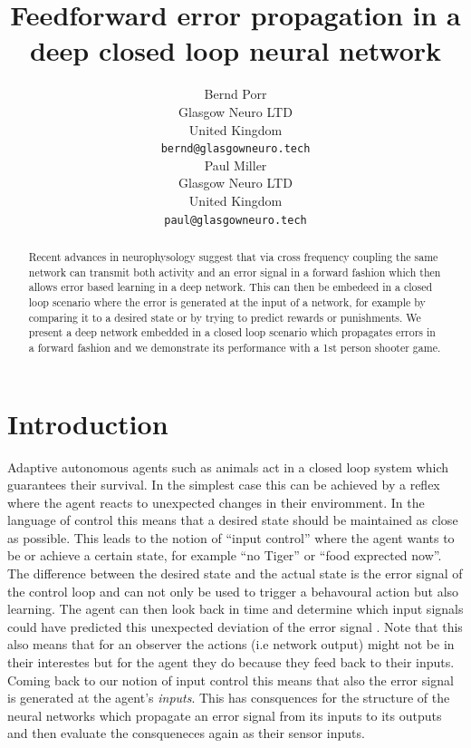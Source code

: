 \documentclass{article}
\title{Feedforward error propagation in a deep closed loop neural network}
\author{
  Bernd Porr\\
  Glasgow Neuro LTD\\
  United Kingdom\\
  \texttt{bernd@glasgowneuro.tech} \\
  Paul Miller \\
  Glasgow Neuro LTD \\
  United Kingdom \\
  \texttt{paul@glasgowneuro.tech}
}
\begin{document}
\maketitle

\begin{abstract}
  Recent advances in neurophysology suggest that via cross frequency
  coupling the same network can transmit both activity and an error
  signal in a forward fashion which then allows error based learning
  in a deep network. This can then be embedeed in a closed loop
  scenario where the error is generated at the input of a network, for
  example by comparing it to a desired state or by trying to predict
  rewards or punishments. We present a deep network embedded in a
  closed loop scenario which propagates errors in a forward fashion
  and we demonstrate its performance with a 1st person shooter game.
\end{abstract}

\section{Introduction}
Adaptive autonomous agents such as animals act in a closed loop system
which guarantees their survival. In the simplest case this can be
achieved by a reflex where the agent reacts to unexpected changes in
their enviromment. In the language of control \cite{Phillips2000} this
means that a desired state should be maintained as close as
possible. This leads to the notion of ``input control'' where the
agent wants to be or achieve a certain state, for example ``no Tiger''
or ``food exprected now''. The difference between the desired state
and the actual state is the error signal of the control loop and can
not only be used to trigger a behavoural action but also learning. The
agent can then look back in time and determine which input signals
could have predicted this unexpected deviation of the error signal
\cite{Sutton82,Klopf86,Verschure91,Sutton98,
  Woergoetter2005,PorrNecoInvco2003,Dayan1992}. Note that this
also means that for an observer the actions (i.e network output) might
not be in their interestes but for the agent they do because they feed
back to their inputs. Coming back to our notion of input control this
means that also the error signal is generated at the agent's
\textsl{inputs}. This has consquences for the structure of the neural
networks which propagate an error signal from its inputs to its
outputs and then evaluate the consqueneces again as their sensor
inputs.
\end{document}

